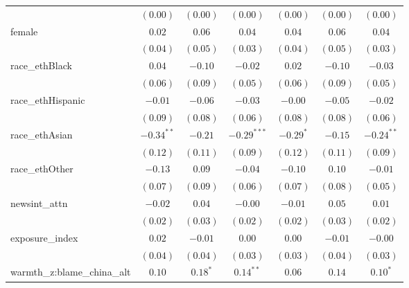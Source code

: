 \begin{tabular}{l c c c c c c}
                            & $(0.00)$      & $(0.00)$     & $(0.00)$      & $(0.00)$      & $(0.00)$     & $(0.00)$      \\
female                      & $0.02$        & $0.06$       & $0.04$        & $0.04$        & $0.06$       & $0.04$        \\
                            & $(0.04)$      & $(0.05)$     & $(0.03)$      & $(0.04)$      & $(0.05)$     & $(0.03)$      \\
race\_ethBlack              & $0.04$        & $-0.10$      & $-0.02$       & $0.02$        & $-0.10$      & $-0.03$       \\
                            & $(0.06)$      & $(0.09)$     & $(0.05)$      & $(0.06)$      & $(0.09)$     & $(0.05)$      \\
race\_ethHispanic           & $-0.01$       & $-0.06$      & $-0.03$       & $-0.00$       & $-0.05$      & $-0.02$       \\
                            & $(0.09)$      & $(0.08)$     & $(0.06)$      & $(0.08)$      & $(0.08)$     & $(0.06)$      \\
race\_ethAsian              & $-0.34^{**}$  & $-0.21$      & $-0.29^{***}$ & $-0.29^{*}$   & $-0.15$      & $-0.24^{**}$  \\
                            & $(0.12)$      & $(0.11)$     & $(0.09)$      & $(0.12)$      & $(0.11)$     & $(0.09)$      \\
race\_ethOther              & $-0.13$       & $0.09$       & $-0.04$       & $-0.10$       & $0.10$       & $-0.01$       \\
                            & $(0.07)$      & $(0.09)$     & $(0.06)$      & $(0.07)$      & $(0.08)$     & $(0.05)$      \\
newsint\_attn               & $-0.02$       & $0.04$       & $-0.00$       & $-0.01$       & $0.05$       & $0.01$        \\
                            & $(0.02)$      & $(0.03)$     & $(0.02)$      & $(0.02)$      & $(0.03)$     & $(0.02)$      \\
exposure\_index             & $0.02$        & $-0.01$      & $0.00$        & $0.00$        & $-0.01$      & $-0.00$       \\
                            & $(0.04)$      & $(0.04)$     & $(0.03)$      & $(0.03)$      & $(0.04)$     & $(0.03)$      \\
warmth\_z:blame\_china\_alt & $0.10$        & $0.18^{*}$   & $0.14^{**}$   & $0.06$        & $0.14$       & $0.10^{*}$    \\

\end{tabular}
